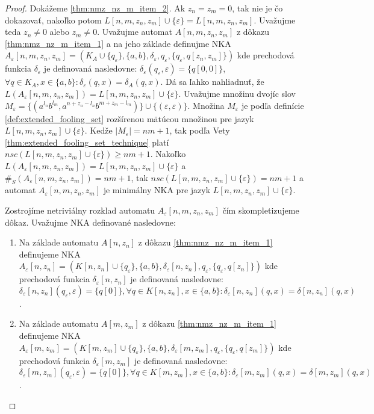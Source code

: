 \begin{proof}
\par
Dokážeme \ref{thm:nmz_nz_m_item_2}. Ak $ z_n=z_m=0 $, tak nie je čo dokazovať, nakoľko potom $ L[n,m,z_n,z_m] \cup \lbrace \varepsilon \rbrace = L[n,m,z_n,z_m] $. Uvažujme teda $ z_n \neq 0 $ alebo $ z_m \neq 0 $. Uvažujme automat $ A[n,m,z_n,z_m] $ z dôkazu \ref{thm:nmz_nz_m_item_1} a na jeho základe definujme NKA $ A_{\varepsilon}[n,m,z_n,z_m] = (K_A \cup \lbrace q_{\varepsilon} \rbrace, \lbrace a,b \rbrace, \delta_{\varepsilon}, q_{\varepsilon}, \lbrace q_{\varepsilon}, q[z_n,z_m] \rbrace) $ kde prechodová funkcia $ \delta_{\varepsilon} $ je definovaná nasledovne: $ \delta_{\varepsilon}(q_{\varepsilon},\varepsilon) = \lbrace q[0,0] \rbrace $, $ \forall q \in K_A, x \in \lbrace a,b \rbrace: \delta_{\varepsilon}(q,x) = \delta_A(q,x) $. Dá sa ľahko nahliadnuť, že $ L(A_{\varepsilon}[n,m,z_n,z_m]) = L[n,m,z_n,z_m] \cup \lbrace \varepsilon \rbrace $. Uvažujme množinu dvojíc slov $ M_{\varepsilon} = \lbrace (a^{l_n}b^{l_m},a^{n+z_n-l_n}b^{m+z_m-l_m}) \rbrace \cup \lbrace (\varepsilon,\varepsilon) \rbrace $. Množina $ M_{\varepsilon} $ je podľa definície \ref{def:extended_fooling_set} rozšírenou mätúcou množinou pre jazyk $ L[n,m,z_n,z_m] \cup \lbrace \varepsilon \rbrace $. Kedže $ |M_{\varepsilon}| = nm+1 $, tak podľa Vety \ref{thm:extended_fooling_set_technique} platí $ nsc(L[n,m,z_n,z_m] \cup \lbrace \varepsilon \rbrace) \geq nm+1$. Nakoľko $ L(A_{\varepsilon}[n,m,z_n,z_m]) = L[n,m,z_n,z_m] \cup \lbrace \varepsilon \rbrace $ a $ \#_S(A_{\varepsilon}[n,m,z_n,z_m]) = nm+1 $, tak $ nsc(L[n,m,z_n,z_m] \cup \lbrace \varepsilon \rbrace) = nm+1 $ a automat $ A_{\varepsilon}[n,m,z_n,z_m] $ je minimálny NKA pre jazyk $ L[n,m,z_n,z_m] \cup \lbrace \varepsilon \rbrace $.
\par
Zostrojíme netriviálny rozklad automatu $ A_{\varepsilon}[n,m,z_n,z_m] $ čím skompletizujeme dôkaz. Uvažujme NKA definované nasledovne:
\begin{enumerate}  
\item Na základe automatu $ A[n,z_n] $ z dôkazu \ref{thm:nmz_nz_m_item_1} definujeme NKA $ A_{\varepsilon}[n,z_n] = (K[n,z_n] \cup \lbrace q_{\varepsilon} \rbrace, \lbrace a,b \rbrace, \delta_{\varepsilon}[n,z_n], q_{\varepsilon}, \lbrace q_{\varepsilon}, q[z_n] \rbrace) $ kde prechodová funkcia $ \delta_{\varepsilon}[n,z_n] $ je definovaná nasledovne: $ \delta_{\varepsilon}[n,z_n](q_{\varepsilon},\varepsilon) = \lbrace q[0] \rbrace, \forall q \in K[n,z_n], x \in \lbrace a,b \rbrace: \delta_{\varepsilon}[n,z_n](q,x) = \delta[n,z_n](q,x) $.
\item Na základe automatu $ A[m,z_m] $ z dôkazu \ref{thm:nmz_nz_m_item_1} definujeme NKA $ A_{\varepsilon}[m,z_m] = (K[m,z_m] \cup \lbrace q_{\varepsilon} \rbrace, \lbrace a,b \rbrace, \delta_{\varepsilon}[m,z_m], q_{\varepsilon}, \lbrace q_{\varepsilon}, q[z_m] \rbrace) $ kde prechodová funkcia $ \delta_{\varepsilon}[m,z_m] $ je definovaná nasledovne: $ \delta_{\varepsilon}[m,z_m](q_{\varepsilon},\varepsilon) = \lbrace q[0] \rbrace, \forall q \in K[m,z_m], x \in \lbrace a,b \rbrace: \delta_{\varepsilon}[m,z_m](q,x) = \delta[m,z_m](q,x) $.

\end{enumerate}
\end{proof}

